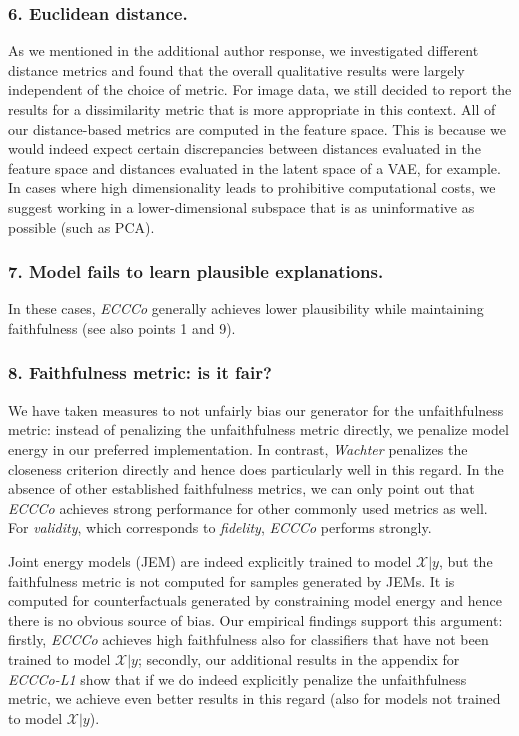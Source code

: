 \documentclass[letterpaper]{article} %
\begin{document}
\subsubsection{6. Euclidean distance.}

As we mentioned in the additional author response, we investigated different distance metrics and found that the overall qualitative results were largely independent of the choice of metric. For image data, we still decided to report the results for a dissimilarity metric that is more appropriate in this context. All of our distance-based metrics are computed in the feature space. This is because we would indeed expect certain discrepancies between distances evaluated in the feature space and distances evaluated in the latent space of a VAE, for example. In cases where high dimensionality leads to prohibitive computational costs, we suggest working in a lower-dimensional subspace that is as uninformative as possible (such as PCA).

\subsubsection{7. Model fails to learn plausible explanations.} 

In these cases, \textit{ECCCo} generally achieves lower plausibility while maintaining faithfulness (see also points 1 and 9).

\subsubsection{8. Faithfulness metric: is it fair?}

We have taken measures to not unfairly bias our generator for the unfaithfulness metric: instead of penalizing the unfaithfulness metric directly, we penalize model energy in our preferred implementation. In contrast, \textit{Wachter} penalizes the closeness criterion directly and hence does particularly well in this regard. In the absence of other established faithfulness metrics, we can only point out that \textit{ECCCo} achieves strong performance for other commonly used metrics as well. For \textit{validity}, which corresponds to \textit{fidelity}, \textit{ECCCo} performs strongly.

Joint energy models (JEM) are indeed explicitly trained to model $\mathcal{X}|y$, but the faithfulness metric is not computed for samples generated by JEMs. It is computed for counterfactuals generated by constraining model energy and hence there is no obvious source of bias. Our empirical findings support this argument: firstly, \textit{ECCCo} achieves high faithfulness also for classifiers that have not been trained to model $\mathcal{X}|y$; secondly, our additional results in the appendix for \textit{ECCCo-L1} show that if we do indeed explicitly penalize the unfaithfulness metric, we achieve even better results in this regard (also for models not trained to model $\mathcal{X}|y$). 
\end{document}
